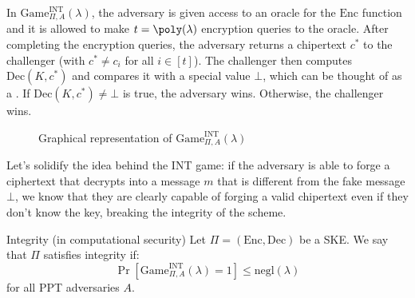 \documentclass[a4paper, 12pt]{report}
\begin{document}
    In $\mathrm{Game}_{\Pi, A}^{\text{INT}}(\lambda)$, the adversary is given access to an oracle for the $\mathrm{Enc}$ function and it is allowed to make $t = \poly(\lambda)$ encryption queries to the oracle. After completing the encryption queries, the adversary returns a chipertext $c^*$ to the challenger (with $c^* \neq c_i$ for all $i \in [t]$). The challenger then computes $\mathrm{Dec}(K, c^*)$ and compares it with a special value $\bot$, which can be thought of as a . If $\mathrm{Dec}(K, c^*) \neq \bot$ is true, the adversary wins. Otherwise, the challenger wins.

    \begin{figure}[H]
        \centering


        \caption{Graphical representation of $\mathrm{Game}^{\text{INT}}_{\Pi, A}(\lambda)$}
    \end{figure}

    Let's solidify the idea behind the INT game: if the adversary is able to forge a ciphertext that decrypts into a message $m$ that is different from the fake message $\bot$, we know that they are clearly capable of forging a valid chipertext even if they don't know the key, breaking the integrity of the scheme.

    \begin{frameddefn}{Integrity (in computational security)}
        Let $\Pi = (\mathrm{Enc}, \mathrm{Dec})$ be a SKE. We say that $\Pi$ satisfies integrity if:
        \[\Pr[\mathrm{Game}^{\text{INT}}_{\Pi, A}(\lambda) = 1] \leq \mathrm{negl}(\lambda)\]
        for all PPT adversaries $A$.
    \end{frameddefn}
\end{document}
